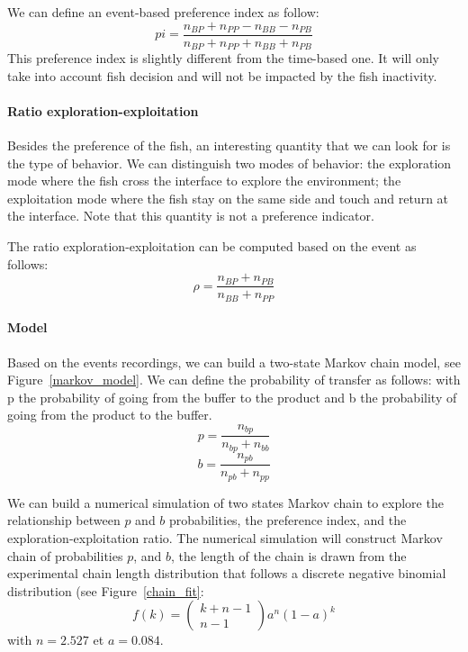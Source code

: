   We can define an event-based preference index as follow:
  $$
  pi = \frac{n_{BP} + n_{PP} - n_{BB} - n_{PB}}{n_{BP} + n_{PP} + n_{BB} + n_{PB}}
  $$
  \noindent This preference index is slightly different from the time-based one. It will only take into account fish decision and will not be impacted by the fish inactivity.

  \paragraph{Ratio exploration-exploitation} Besides the preference of the fish, an interesting quantity that we can look for is the type of behavior. We can distinguish two modes of behavior: the exploration mode where the fish cross the interface to explore the environment; the exploitation mode where the fish stay on the same side and touch and return at the interface. Note that this quantity is not a preference indicator.

  The ratio exploration-exploitation can be computed based on the event as follows:
  $$
  \rho=\frac{n_{BP} + n_{PB}}{n_{BB} + n_{PP}}
  $$
  \paragraph{Model} Based on the events recordings, we can build a two-state Markov chain model, see Figure~\ref{markov_model}. We can define the probability of transfer as follows:
  \noindent with p the probability of going from the buffer to the product and b the probability of going from the product to the buffer.
  $$
  p = \frac{n_{bp}}{n_{bp} + n_{bb}}
  $$
  $$
  b = \frac{n_{pb}}{n_{pb} + n_{pp}}
  $$

  We can build a numerical simulation of two states Markov chain to explore the relationship between $p$ and $b$ probabilities, the preference index, and the exploration-exploitation ratio. The numerical simulation will construct Markov chain of probabilities $p$, and $b$, the length of the chain is drawn from the experimental chain length distribution that follows a discrete negative binomial distribution (see Figure~\ref{chain_fit}:
  $$
  f(k) = \begin{pmatrix}
  k+n-1\\
  n-1
  \end{pmatrix}
  a^n(1-a)^k
  $$
  \noindent with $n=2.527$ et $a=0.084$.

